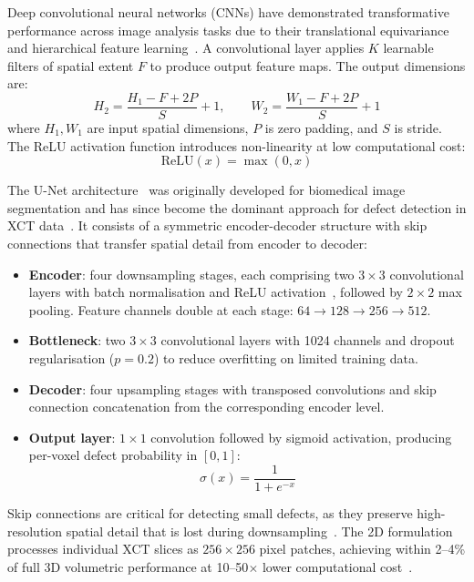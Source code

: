 Deep convolutional neural networks (CNNs) have demonstrated transformative performance across image
analysis tasks due to their translational equivariance and hierarchical feature
learning~\citep{Smith2022}. A convolutional layer applies $K$ learnable filters of spatial extent $F$
to produce output feature maps. The output dimensions are:
\begin{equation}
H_2 = \frac{H_1 - F + 2P}{S} + 1,
\qquad
W_2 = \frac{W_1 - F + 2P}{S} + 1
\label{eq:conv_dims}
\end{equation}
where $H_1, W_1$ are input spatial dimensions, $P$ is zero padding, and $S$ is stride. The ReLU
activation function introduces non-linearity at low computational cost:
\begin{equation}
\mathrm{ReLU}(x) = \max(0, x)
\label{eq:relu}
\end{equation}

The U-Net architecture~\citep{Ronneberger2015} was originally developed for biomedical image
segmentation and has since become the dominant approach for defect detection in XCT
data~\citep{Deshpande2024}. It consists of a symmetric encoder-decoder structure with skip
connections that transfer spatial detail from encoder to decoder:
\begin{itemize}
\item \textbf{Encoder}: four downsampling stages, each comprising two $3\times3$ convolutional
  layers with batch normalisation and ReLU activation~\citep{Ronneberger2015}, followed by
  $2\times2$ max pooling. Feature channels double at each stage: $64 \to 128 \to 256 \to 512$.
\item \textbf{Bottleneck}: two $3\times3$ convolutional layers with 1024 channels and dropout
  regularisation ($p = 0.2$) to reduce overfitting on limited training data.
\item \textbf{Decoder}: four upsampling stages with transposed convolutions and skip connection
  concatenation from the corresponding encoder level.
\item \textbf{Output layer}: $1\times1$ convolution followed by sigmoid activation, producing
  per-voxel defect probability in $[0, 1]$:
\begin{equation}
\sigma(x) = \frac{1}{1 + e^{-x}}
\label{eq:sigmoid}
\end{equation}
\end{itemize}
Skip connections are critical for detecting small defects, as they preserve high-resolution spatial
detail that is lost during downsampling~\citep{Ronneberger2015}. The 2D formulation processes
individual XCT slices as $256 \times 256$ pixel patches, achieving within 2--4\% of full 3D
volumetric performance at 10--50$\times$ lower computational cost~\citep{Wong2021}.

